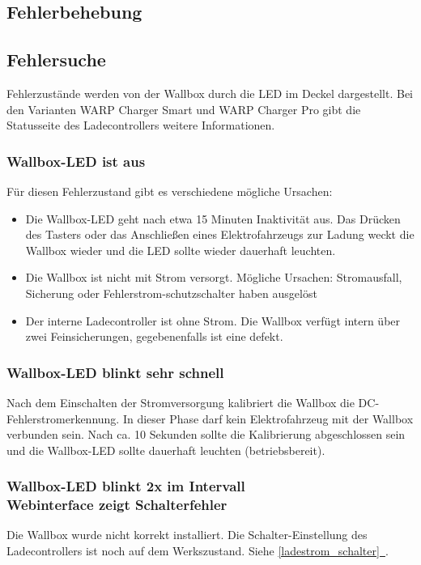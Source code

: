 \documentclass[a4paper,10pt]{article}
\newcommand*{\fullref}[1]{\hyperref[{#1}]{\ref*{#1}~\nameref*{#1}}}
\begin{document}
\begin{multicols*}{2}
	\newpage \section{Fehlerbehebung}\label{fehlerbehebung} \subsection{Fehlersuche}
	Fehlerzustände werden von der Wallbox durch die LED im Deckel
	dargestellt. Bei den Varianten WARP Charger Smart und WARP Charger Pro gibt die Statusseite des Ladecontrollers
	weitere Informationen.

	\subsubsection*{Wallbox-LED ist aus}
	Für diesen Fehlerzustand gibt es verschiedene mögliche Ursachen:
	\begin{itemize}
		\item Die Wallbox-LED geht nach etwa 15 Minuten Inaktivität aus. Das Drücken des Tasters
		      oder das Anschließen eines Elektrofahrzeugs zur Ladung weckt die Wallbox wieder
		      und die LED sollte wieder dauerhaft leuchten.
		\item Die Wallbox ist nicht mit Strom versorgt. Mögliche Ursachen: Stromausfall,
		      Sicherung oder Fehlerstrom-schutzschalter haben ausgelöst
		\item Der interne Ladecontroller ist ohne Strom. Die Wallbox verfügt intern über zwei
		      Feinsicherungen, gegebenenfalls ist eine defekt.
	\end{itemize}

	\subsubsection*{Wallbox-LED blinkt sehr schnell}
	Nach dem Einschalten der Stromversorgung kalibriert die Wallbox die
	DC-Fehlerstromerkennung. In dieser Phase darf kein Elektrofahrzeug mit der
	Wallbox verbunden sein. Nach ca. 10 Sekunden sollte die Kalibrierung
	abgeschlossen sein und die Wallbox-LED sollte dauerhaft leuchten
	(betriebsbereit).

	\subsubsection*{Wallbox-LED blinkt 2x im Intervall \\ Webinterface zeigt Schalterfehler}
	Die Wallbox wurde nicht korrekt installiert. Die Schalter-Einstellung des Ladecontrollers ist
	noch auf dem Werkszustand. Siehe \fullref{ladestrom_schalter}.


\end{multicols*}
\end{document}
